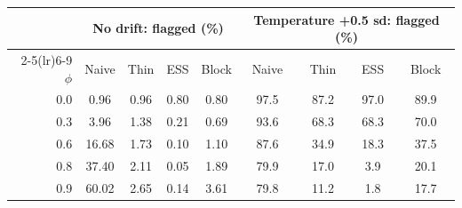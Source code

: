 \begin{tabular}{rcccc@{\hspace{1.6em}}cccc}
\toprule
 & \multicolumn{4}{c}{\textbf{No drift: flagged (\%)}} & \multicolumn{4}{c}{\textbf{Temperature +0.5 sd: flagged (\%)}} \\
\cmidrule(lr){2-5}\cmidrule(lr){6-9}
$\phi$ & Naive & Thin & ESS & Block & Naive & Thin & ESS & Block \\
\midrule
0.0 & 0.96 & 0.96 & 0.80 & 0.80 & 97.5 & 87.2 & 97.0 & 89.9 \\
0.3 & 3.96 & 1.38 & 0.21 & 0.69 & 93.6 & 68.3 & 68.3 & 70.0 \\
0.6 & 16.68 & 1.73 & 0.10 & 1.10 & 87.6 & 34.9 & 18.3 & 37.5 \\
0.8 & 37.40 & 2.11 & 0.05 & 1.89 & 79.9 & 17.0 & 3.9 & 20.1 \\
0.9 & 60.02 & 2.65 & 0.14 & 3.61 & 79.8 & 11.2 & 1.8 & 17.7 \\
\bottomrule
\end{tabular}
